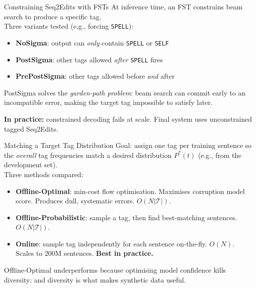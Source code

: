 \documentclass[aspectratio=169]{beamer}
\newcommand{\errtag}[1]{\texttt{#1}}
\begin{document}

\begin{frame}{Constraining Seq2Edits with FSTs}
  At inference time, an FST constrains beam search to produce a specific tag.\\[1em]
  Three variants tested (e.g., forcing \errtag{SPELL}):

  \vspace{0.5em}
  \begin{itemize}
    \item \textbf{NoSigma}: output can \emph{only} contain \errtag{SPELL} or \errtag{SELF}
    \item \textbf{PostSigma}: other tags allowed \emph{after} \errtag{SPELL} fires
    \item \textbf{PrePostSigma}: other tags allowed before \emph{and} after
  \end{itemize}

  \vspace{1em}
  PostSigma solves the \emph{garden-path problem}: beam search can commit
  early to an incompatible error, making the target tag impossible to satisfy later.

  \vspace{1em}
  \textbf{In practice:} constrained decoding fails at scale.
  Final system uses unconstrained tagged Seq2Edits.
\end{frame}


\begin{frame}{Matching a Target Tag Distribution}
  Goal: assign one tag per training sentence so the \emph{overall} tag frequencies
  match a desired distribution $P^*(t)$ (e.g., from the development set).\\[1.5em]

  Three methods compared:

  \begin{itemize}
    \item \textbf{Offline-Optimal}: min-cost flow optimisation. Maximises
      corruption model score. Produces dull, systematic errors. $O(N|\mathcal{T}|)$.
    \item \textbf{Offline-Probabilistic}: sample a tag, then find best-matching
      sentences. $O(N|\mathcal{T}|)$.
    \item \textbf{Online}: sample tag independently for each sentence on-the-fly.
      $O(N)$. Scales to 200M sentences. \textbf{Best in practice.}
  \end{itemize}

  \vspace{1em}
  Offline-Optimal underperforms because optimising model confidence
  kills diversity: and diversity is what makes synthetic data useful.
\end{frame}
\end{document}
